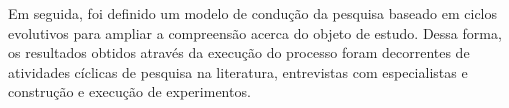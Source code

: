 Em seguida, foi definido um modelo de condução da pesquisa baseado em ciclos evolutivos para ampliar a compreensão acerca do objeto de estudo. Dessa forma, os resultados obtidos através da execução do processo foram decorrentes de atividades cíclicas de pesquisa na literatura, entrevistas com especialistas e construção e execução de experimentos.